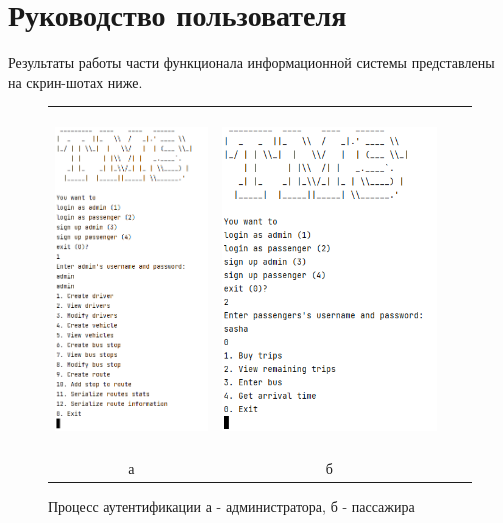 \section{Руководство пользователя}
Результаты работы части функционала информационной системы представлены на скрин-шотах ниже. 


\begin{figure}[b!]
    \centering
    \begin{tabular}{cccc}
         \includegraphics[height=9cm]{images/Login_Admin.png} & 
         \includegraphics[height=9cm]{images/Login_Passenger.png} \\
         а & б \\[1em]
    \end{tabular}
    \caption{Процесс аутентификации а - администратора, б - пассажира}
\end{figure}

